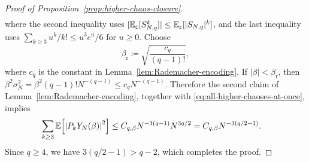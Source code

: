 \documentclass[../CLT_SYK.tex]{subfiles}
\begin{document}
\begin{proof}[Proof of Proposition~\ref{prop:higher-chaos-closure}]
\begin{align}
    \label{eq:all-higher-chaoses-at-once}
  \end{align}
  where the second inequality uses $|\mathbb E_\varepsilon[S_{N,q}^k]| \leq \mathbb E_\varepsilon[|S_{N,q}|^k]$,
  and the last inequality uses $\sum_{k\geq3}u^k / k! \leq u^3e^u/6$ for $u\geq0$.
  Choose
  \begin{equation*}
    \beta_{\mathrm{r}}
    \coloneqq
      \sqrt{\frac{c_q}{(q-1)!}},
  \end{equation*}
  where $c_q$ is the constant in Lemma~\ref{lem:Rademacher-encoding}.
  If $|\beta| < \beta_{\mathrm{r}}$, then $\beta^2\sigma_N^2 = \beta^2(q-1)!N^{-(q-1)} \leq c_q N^{-(q-1)}$.
  Therefore the second claim of Lemma~\ref{lem:Rademacher-encoding}, together with \eqref{eq:all-higher-chaoses-at-once}, implies
  \begin{align*}
    \sum_{k\geq3}
    \E\mleft[
      \left|P_k Y_N(\beta)\right|^2
    \mright]
    &\leq
      C_{q, \beta}
      N^{-3(q-1)}
      N^{3q/2}
    =
      C_{q, \beta}
      N^{-3(q/2-1)}.
  \end{align*}
  Since $q \geq 4$, we have $3 (q / 2 - 1) > q - 2$, which completes the proof.
\end{proof}
\end{document}
